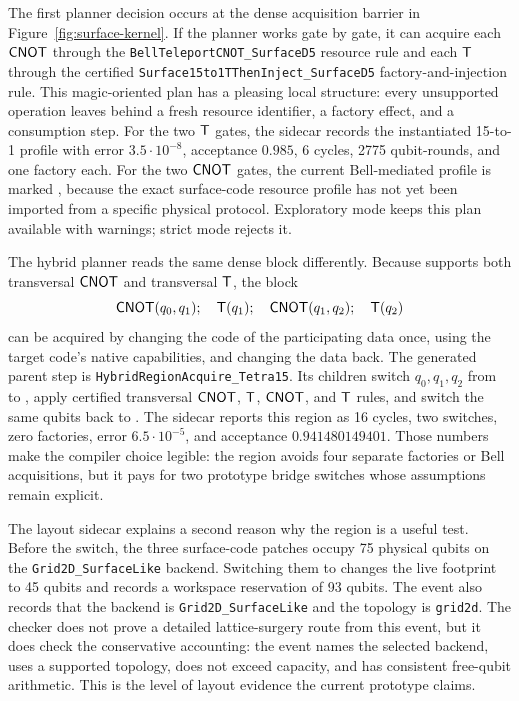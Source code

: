 The first planner decision occurs at the dense acquisition barrier in Figure~\ref{fig:surface-kernel}.
If the planner works gate by gate, it can acquire each $\mathsf{CNOT}$ through the \texttt{BellTeleportCNOT\_SurfaceD5} resource rule and each $\mathsf{T}$ through the certified \texttt{Surface15to1TThenInject\_SurfaceD5} factory-and-injection rule.
This magic-oriented plan has a pleasing local structure: every unsupported operation leaves behind a fresh resource identifier, a factory effect, and a consumption step.
For the two $\mathsf{T}$ gates, the sidecar records the instantiated 15-to-1 profile with error $3.5\cdot 10^{-8}$, acceptance $0.985$, 6 cycles, 2775 qubit-rounds, and one factory each.
For the two $\mathsf{CNOT}$ gates, the current Bell-mediated profile is marked \Assumed{}, because the exact surface-code resource profile has not yet been imported from a specific physical protocol.
Exploratory mode keeps this plan available with warnings; strict mode rejects it.

The hybrid planner reads the same dense block differently.
Because  supports both transversal $\mathsf{CNOT}$ and transversal $\mathsf{T}$, the block
\[
  \mathsf{CNOT}(q_0,q_1);\quad
  \mathsf{T}(q_1);\quad
  \mathsf{CNOT}(q_1,q_2);\quad
  \mathsf{T}(q_2)
\]
can be acquired by changing the code of the participating data once, using the target code's native capabilities, and changing the data back.
The generated parent step is \texttt{HybridRegionAcquire\_Tetra15}.
Its children switch $q_0,q_1,q_2$ from  to , apply certified transversal $\mathsf{CNOT}$, $\mathsf{T}$, $\mathsf{CNOT}$, and $\mathsf{T}$ rules, and switch the same qubits back to .
The sidecar reports this region as 16 cycles, two switches, zero factories, error $6.5\cdot 10^{-5}$, and acceptance $0.941480149401$.
Those numbers make the compiler choice legible: the region avoids four separate factories or Bell acquisitions, but it pays for two prototype bridge switches whose assumptions remain explicit.

The layout sidecar explains a second reason why the region is a useful test.
Before the switch, the three surface-code patches occupy 75 physical qubits on the \texttt{Grid2D\_SurfaceLike} backend.
Switching them to  changes the live footprint to 45 qubits and records a workspace reservation of 93 qubits.
The event also records that the backend is \texttt{Grid2D\_SurfaceLike} and the topology is \texttt{grid2d}.
The checker does not prove a detailed lattice-surgery route from this event, but it does check the conservative accounting: the event names the selected backend, uses a supported topology, does not exceed capacity, and has consistent free-qubit arithmetic.
This is the level of layout evidence the current prototype claims.


